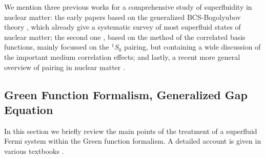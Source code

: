 \documentclass[runningheads]{svmult}
\def\ss{^1\!S_0}
\begin{document}
We mention three previous works for a comprehensive study of superfluidity in
nuclear matter: 
the early papers based on the generalized BCS-Bogolyubov
theory \cite{TAM,TAKA93}, which already give a systematic survey of most
superfluid states of nuclear matter; 
the second one \cite{CHEN93}, based on the method of the correlated basis 
functions, mainly focussed on the $\ss$ pairing, but
containing a wide discussion of the important medium correlation effects;
and lastly, a recent more general overview of pairing in 
nuclear matter \cite{ULOM}.

\subsection{Green Function Formalism, Generalized Gap Equation}
\label{s:green}

In this section we briefly review the main points of the treatment 
of a superfluid Fermi system within the Green function formalism. 
A detailed account is given in various 
textbooks \cite{ABRI,NOZ63,NOZ66,SCHRIEF,MIG,RS}.
\end{document}
